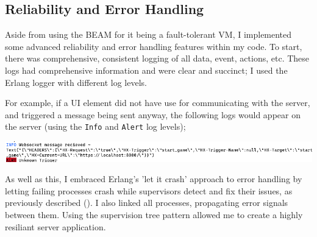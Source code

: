 \documentclass[]{final}
\begin{document}
\newpage

\subsection{Reliability and Error Handling}

Aside from using the BEAM for it being a fault-tolerant VM, I implemented some
advanced reliability and error handling features within my code. To start, there
was comprehensive, consistent logging of all data, event, actions, etc. These
logs had comprehensive information and were clear and succinct; I used the
Erlang logger with different log levels.%

For example, if a UI element did not have use for communicating with the server,
and triggered a message being sent anyway, the following logs would appear on the
server (using the \lstinline|Info| and \lstinline|Alert| log levels);

\includegraphics[width=\linewidth]{unknown_trigger_alert.png}

As well as this, I embraced Erlang's 'let it crash' approach to error
handling by letting failing processes crash while supervisors detect and
fix their issues, as previously described {\hypersetup{linkcolor=teal}(\pageref{faultErlang})}.
I also linked all processes, propagating error signals between them.
Using the supervision tree pattern allowed me to create a highly resiliant \cite{noauthor_gleam-otp-design-principals/gleam-otp-design-principals.org_nodate}
server application.
\end{document}
